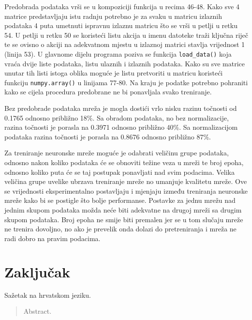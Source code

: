 \documentclass[times, utf8, diplomski]{fer}
\begin{document}
Predobrada podataka vrši se u kompoziciji funkcija u recima 46-48. Kako sve 4 matrice predstavljaju
istu radnju potrebno je za svaku u matricu izlaznih podataka 4 puta umetnuti ispravnu izlaznu matricu
što se vrši u petlji u retku 54. U petlji u retku 50 se koristeći listu akcija u imenu datoteke traži
ključna riječ te se ovisno o akciji na adekvatnom mjestu u izlaznoj matrici stavlja vrijednost 1
(linija 53). U glavnome dijelu programa poziva se funkcija \texttt{load\_data()} koja vraća dvije liste
podataka, listu ulaznih i izlaznih podataka. Kako su sve matrice unutar tih listi istoga oblika
moguće je listu pretvoriti u matricu koristeći funkciju \texttt{numpy.array()} u linijama 77-80.
Na kraju je podatke potrebno pohraniti kako se cijela procedura predobrane ne bi ponavljala svako
treniranje.

Bez predobrade podataka mreža je mogla dostići vrlo nisku razinu točnosti od 0.1765 odnosno približno 18\%.
Sa obradom podataka, no bez normalizacije, razina točnosti je porasla na 0.3971 odnosno približno 40\%.
Sa normalizacijom podataka razina točnosti je porasla na 0.8676 odnosno približno 87\%.

Za treniranje neuronske mreže moguće je odabrati veličinu grupe podataka, odnosno nakon koliko podataka će se
obnoviti težine veza u mreži te broj epoha, odnosno koliko puta će se taj postupak ponavljati nad svim podacima.
Velika veličina grupe uvelike ubrzava treniranje mreže no umanjuje kvalitetu mreže. Ove se vrijednosti
eksperimentalno postavljaju i mjenjaju između treniranja neuronske mreže kako bi se postigle što bolje
performanse. Postavke za jednu mrežu nad jednim skupom podataka možda neće biti adekvatne na drugoj mreži
sa drugim skupom podataka. Broj epoha ne smije biti premalen jer se u tom slučaju mreže ne trenira dovoljno,
no ako je prevelik onda dolazi do pretreniranja i mreža ne radi dobro na pravim podacima.


\chapter{Zaključak}





\begin{sazetak}
Sažetak na hrvatskom jeziku.

\end{sazetak}

\begin{abstract}
Abstract.

\end{abstract}
\end{document}
